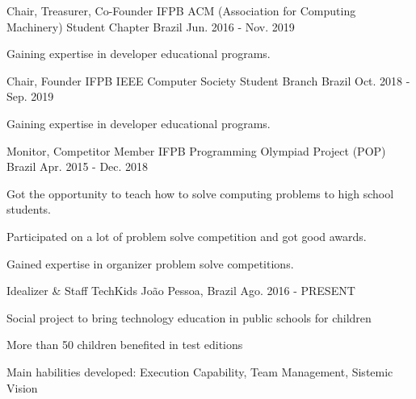 

\begin{cventries}

  \cventry
    {Chair, Treasurer, Co-Founder} %
    {IFPB ACM (Association for Computing Machinery) Student Chapter} %
    {Brazil} %
    {Jun. 2016 - Nov. 2019} %
    {
      \begin{cvitems} %
        \item {Gaining expertise in developer educational programs.}
      \end{cvitems}
    }
        
  \cventry
    {Chair, Founder} %
    {IFPB IEEE Computer Society Student Branch} %
    {Brazil} %
    {Oct. 2018 - Sep. 2019} %
    {
      \begin{cvitems} %
        \item {Gaining expertise in developer educational programs.}
      \end{cvitems}
    }

  \cventry
    {Monitor, Competitor Member} %
    {IFPB Programming Olympiad Project (POP)} %
    {Brazil} %
    {Apr. 2015 - Dec. 2018} %
    {
      \begin{cvitems} %
        \item {Got the opportunity to teach how to solve computing problems to high school students.}
        \item {Participated on a lot of problem solve competition and got good awards.}
        \item {Gained expertise in organizer problem solve competitions.}
      \end{cvitems}
    }

\cventry
    {Idealizer \& Staff}
    {TechKids}
    {João Pessoa, Brazil}
    {Ago. 2016 - PRESENT}
    {
      \begin{cvitems}
        \item {Social project to bring technology education in public schools for children}
        \item {More than 50 children benefited in test editions}
        \item {Main habilities developed: Execution Capability, Team Management, Sistemic Vision}
      \end{cvitems}
    }
    

\end{cventries}
